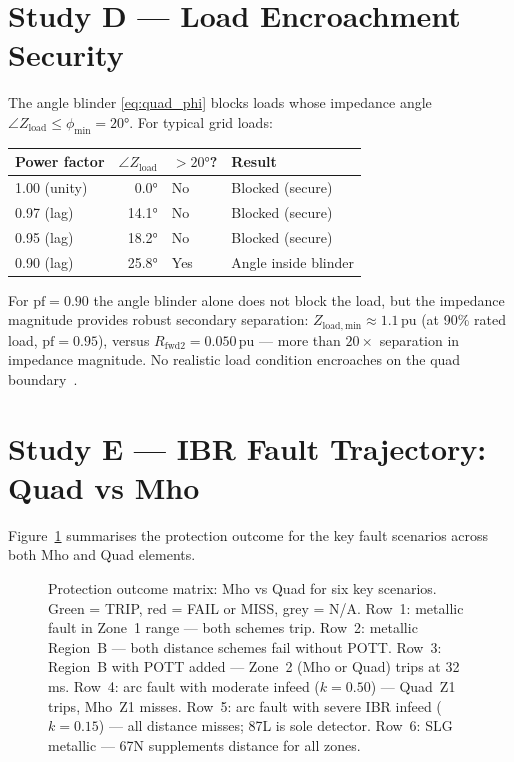 \documentclass[11pt,a4paper]{article}
\begin{document}
\section{Study D --- Load Encroachment Security}
\label{sec:studyD}

The angle blinder \eqref{eq:quad_phi} blocks loads whose impedance angle
$\angle Z_\mathrm{load}\leq\phi_\mathrm{min}=20°$.  For typical grid loads:

\begin{center}
\begin{tabular}{@{}lrll@{}}
\toprule
Power factor & $\angle Z_\mathrm{load}$ & $> 20°$? & Result\\
\midrule
1.00 (unity)     & 0.0°  & No  & Blocked (secure)\\
0.97 (lag)       & 14.1° & No  & Blocked (secure)\\
0.95 (lag)       & 18.2° & No  & Blocked (secure)\\
0.90 (lag)       & 25.8° & Yes & Angle inside blinder\\
\bottomrule
\end{tabular}
\end{center}

\noindent
For $\mathrm{pf}=0.90$ the angle blinder alone does not block the load, but the
impedance magnitude provides robust secondary separation:
$Z_\mathrm{load,min}\approx1.1$\,pu (at 90\% rated load, $\mathrm{pf}=0.95$),
versus $R_\mathrm{fwd2}=0.050$\,pu --- more than $20\times$ separation in
impedance magnitude.  No realistic load condition encroaches on the quad
boundary~\cite{IEC_60255_121}.

\section{Study E --- IBR Fault Trajectory: Quad vs Mho}
\label{sec:studyE}

Figure~\ref{fig:comparison} summarises the protection outcome for the key fault
scenarios across both Mho and Quad elements.

\begin{figure}[htbp]
  \centering
  \resizebox{0.99\textwidth}{!}{%
  }
  \caption{Protection outcome matrix: Mho vs Quad for six key scenarios.
           Green = TRIP, red = FAIL or MISS, grey = N/A.
           Row~1: metallic fault in Zone~1 range --- both schemes trip.
           Row~2: metallic Region~B --- both distance schemes fail without POTT.
           Row~3: Region~B with POTT added --- Zone~2 (Mho or Quad) trips at 32\,ms.
           Row~4: arc fault with moderate infeed ($k=0.50$) --- Quad~Z1 trips, Mho~Z1 misses.
           Row~5: arc fault with severe IBR infeed ($k=0.15$) --- all distance misses;
           87L is sole detector.
           Row~6: SLG metallic --- 67N supplements distance for all zones.}
  \label{fig:comparison}
\end{figure}
\end{document}
